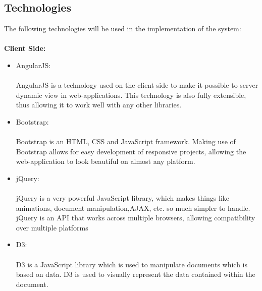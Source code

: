 \subsection{Technologies}
The following technologies will be used in the implementation of the system:\\ \\
{\bfseries Client Side:}
\begin{itemize}
	\item AngularJS: \\ \\
	AngularJS is a technology used on the client side to make it possible to server dynamic view in web-applications. This technology is also fully extensible, thus allowing it to work well with any other libraries.
	\item Bootstrap: \\ \\
	Bootstrap is an HTML, CSS and JavaScript framework. Making use of Bootstrap allows for easy development of responsive projects, allowing the web-application to look beautiful on almost any platform.
	\item jQuery: \\ \\
	jQuery is a very powerful JavaScript library, which makes things like animations, document manipulation,AJAX, etc. so much simpler to handle. jQuery is an API that works across multiple browsers, allowing compatibility over multiple platforms
	\item D3: \\ \\
	D3 is a JavaScript library which is used to manipulate documents which is based on data. D3 is used to visually represent the data contained within the document.
\end{itemize}

